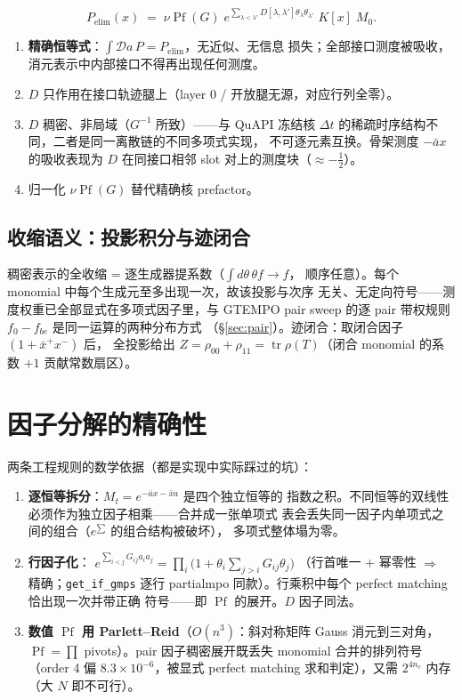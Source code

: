 \documentclass[11pt,a4paper]{ctexart}
\newcommand{\ab}{\bar a}          %
\newcommand{\xb}{\bar x}          %
\newcommand{\Pf}{\operatorname{Pf}}
\newcommand{\tr}{\operatorname{tr}}
\newcommand{\Deff}{D}             %
\newcommand{\Pelim}{P_{\mathrm{elim}}}
\begin{document}
\begin{equation}
\Pelim(x)\;=\;\nu\Pf(G)\;
   e^{\sum_{\lambda<\lambda'}\Deff[\lambda,\lambda']\theta_\lambda\theta_{\lambda'}}\;
   K[x]\;M_0 .
\label{eq:pelim}
\end{equation}
\begin{enumerate}
\item \textbf{精确恒等式}：$\int\mathcal Da\,P=\Pelim$，无近似、无信息
  损失；全部接口测度被吸收，消元表示中内部接口不得再出现任何测度。
\item $\Deff$ 只作用在接口轨迹腿上（layer 0 / 开放腿无源，对应行列全零）。
\item $\Deff$ 稠密、非局域（$G^{-1}$ 所致）——与 QuAPI 冻结核
  $\Delta t$ 的稀疏时序结构不同，二者是同一离散链的不同多项式实现，
  不可逐元素互换。骨架测度 $-\ab x$ 的吸收表现为 $\Deff$ 在同接口相邻
  slot 对上的测度块（$\approx-\tfrac12$）。
\item 归一化 $\nu\Pf(G)$ 替代精确核 prefactor。
\end{enumerate}

\subsection{收缩语义：投影积分与迹闭合}

稠密表示的全收缩 = 逐生成器提系数（$\int d\theta\,\theta f\to f$，
顺序任意）。每个 monomial 中每个生成元至多出现一次，故该投影与次序
无关、无定向符号——测度权重已全部显式在多项式因子里，与 GTEMPO pair
sweep 的逐 pair 带权规则 $f_0-f_{be}$ 是同一运算的两种分布方式
（\S\ref{sec:pair}）。迹闭合：取闭合因子 $(1+\xb^{+}x^{-})$ 后，
全投影给出 $Z=\rho_{00}+\rho_{11}=\tr\rho(T)$（闭合 monomial 的系数
$+1$ 贡献常数扇区）。

\section{因子分解的精确性}

两条工程规则的数学依据（都是实现中实际踩过的坑）：

\begin{enumerate}
\item \textbf{逐恒等拆分}：$M_t=e^{-\ab x-\xb a}$ 是四个独立恒等的
  指数之积。不同恒等的双线性必须作为独立因子相乘——合并成一张单项式
  表会丢失同一因子内单项式之间的组合（$e^{\sum}$ 的组合结构被破坏），
  多项式整体塌为零。
\item \textbf{行因子化}：
  $e^{\sum_{i<j}G_{ij}a_ia_j}
  =\prod_i\Big(1+\theta_i\sum_{j>i}G_{ij}\theta_j\Big)$
  （行首唯一 + 幂零性 $\Rightarrow$ 精确；\texttt{get\_if\_gmps} 逐行
  partialmpo 同款）。行乘积中每个 perfect matching 恰出现一次并带正确
  符号——即 $\Pf$ 的展开。$\Deff$ 因子同法。
\item \textbf{数值 $\Pf$ 用 Parlett--Reid}（$O(n^3)$：斜对称矩阵
  Gauss 消元到三对角，$\Pf=\prod$ pivots）。pair 因子稠密展开既丢失
  monomial 合并的排列符号（order 4 偏 $8.3\times10^{-6}$，被显式
  perfect matching 求和判定），又需 $2^{4n_c}$ 内存（大 $N$ 即不可行）。
\end{enumerate}
\end{document}
